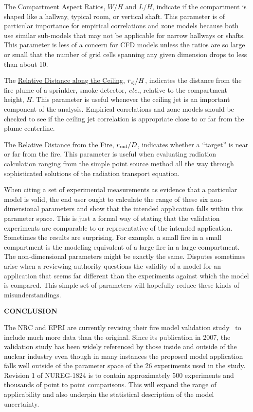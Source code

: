 \documentclass[fleqn,b5paper]{article}
\begin{document}
The \underline{Compartment Aspect Ratios}, $W/H$ and $L/H$, indicate if the compartment is shaped like a hallway, typical room, or vertical shaft. This parameter is of particular importance for empirical correlations and zone models because both use similar sub-models that may not be applicable for narrow hallways or shafts. This parameter is less of a concern for CFD models unless the ratios are so large or small that the number of grid cells spanning any given dimension drops to less than about 10.

The \underline{Relative Distance along the Ceiling}, $r_{\rm cj}/H$, indicates the distance from the fire plume of a sprinkler, smoke detector, {\em etc.}, relative to the compartment height, $H$. This parameter is useful whenever the ceiling jet is an important component of the analysis. Empirical correlations and zone models should be checked to see if the ceiling jet correlation is appropriate close to or far from the plume centerline.

The \underline{Relative Distance from the Fire}, $r_{\rm rad}/D$, indicates whether a ``target'' is near or far from the fire. This parameter is useful when evaluating radiation calculation ranging from the simple point source method all the way through sophisticated solutions of the radiation transport equation.

When citing a set of experimental measurements as evidence that a particular model is valid, the end user ought to calculate the range of these six non-dimensional parameters and show that the intended application falls within this parameter space. This is just a formal way of stating that the validation experiments are comparable to or representative of the intended application. Sometimes the results are surprising. For example, a small fire in a small compartment is the modeling equivalent of a large fire in a large compartment. The non-dimensional parameters might be exactly the same. Disputes sometimes arise when a reviewing authority questions the validity of a model for an application that seems far different than the experiments against which the model is compared. This simple set of parameters will hopefully reduce these kinds of misunderstandings.


\vspace{\parskip}
{\bf CONCLUSION}

The NRC and EPRI are currently revising their fire model validation study~\cite{NUREG_1824} to include much more data than the original. Since its publication in 2007, the validation study has been widely referenced by those inside and outside of the nuclear industry even though in many instances the proposed model application falls well outside of the parameter space of the 26 experiments used in the study. Revision 1 of NUREG-1824 is to contain approximately 500 experiments and thousands of point to point comparisons. This will expand the range of applicability and also underpin the statistical description of the model uncertainty. 
\end{document}
